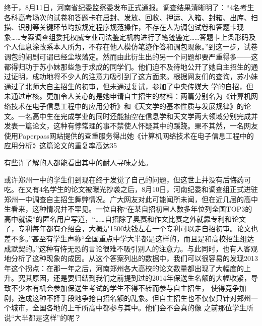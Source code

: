 \documentclass{article}
\begin{document}
终于，8⽉11⽇，河南省纪委监察委发布正式通报。调查结果清晰明了：“4名考⽣各科⾼考场次的试卷和答题卡在启封、发放、回收、押运、⼊箱、封箱、出库、扫描、识别等关键环节均按规定程序规范操作，不存在⼈为调包试卷和答题卡现象……专案调查组委托权威专业司法鉴定机构进⾏了笔迹鉴定……答题卡上条形码及个⼈信息涂改系本⼈所为，不存在他⼈模仿笔迹作答和调包现象。”到这⼀步，试卷调包的闹剧可谓已经尘埃落定。然⽽由此衍⽣出的另⼀个问题却要严重得多——这都得归功于苏⼩妹那些急于求成的同学们。他们迫不及待地公开了她⾃主招⽣的通过证明，成功地将不少⼈的注意⼒吸引到了这⽅⾯来。根据⽹友们的查询，苏⼩妹通过了北师⼤⾃主招⽣的初审，但未通过复试，参加了中央传媒⼤
\newpage
学的⾃招，但未通过审核。更加令⼈关⼼的是她申请⾃主招⽣的材料：两篇分别名为《计算机⽹络技术在电⼦信息⼯程中的应⽤分析》和《天⽂学的基本性质与发展规律》的论⽂。⼀名⾼中⽣在完成学业的同时还能抽空在信息学和天⽂学两⼤领域分别完成并发表⼀篇论⽂，这种有悖常理的事不禁使⼈怀疑其中的蹊跷。果不其然，⼀名⽹友使⽤Paperpass⽹站提供的查重服务得出她《计算机⽹络技术在电⼦信息⼯程中的应⽤分析》这篇论⽂的重复率⾼达35%
\newpage

有些许了解的⼈都能看出其中的耐⼈寻味之处。 

或许郑州⼀中的学⽣们到现在终于发觉了⾃⼰的问题，但这世上并没有后悔药可吃。在又有4名学⽣的论⽂被曝光抄袭之后，8⽉10⽇，河南纪委和调查组正式进驻郑州⼀中调查⾃主招⽣舞弊情况。⼴⼤⽹友对此可能闻所未闻，但在近⼏届的⾼中⽣看来，这种情况并不罕见。⼀位⾃称“在某⾃招初审⼈数多年位列全国TOP3的⾼中就读”的匿名⽤户写道，“……⾃招除了奥赛和作⽂⽐赛之外就靠专利和论⽂了，专利每年都有介绍会，⼤概是1500块钱左右⼀个专利可以⾛⾃招初审。论⽂也差不多。”甚⾄有学⽣声称“全国重点中学⼤半都是这样的，⽽且是和⾼校招⽣组达成默契的。”这种有恃⽆恐的⾔论很难不吸引别⼈的注意⼒。与此同时，也有⼈客观地分析了这种现象的成因。从这个答案列出的数据中，我们可以很容易的发现2013年这个拐点：在那⼀年之后，河南郑州各⼤⾼校的论⽂数量都出现了⼤幅度的上升。究其原因，还是要归结到我们之前提到过的2014年保送⽣名额的⼤幅收紧，导致不少本有机会参加保送⽣考试的学⽣不得不转⽽参与⾃主招⽣，
\newpage
使得竞争加剧，造成这种不择⼿段地争抢⾃招名额的乱象。但⾃主招⽣也不仅仅只针对郑州⼀个城市，全国各地的上千所⾼中都参与其中。他们会不会真的像
之前那位学⽣所说“⼤半都是这样”的呢？ 
\end{document}
